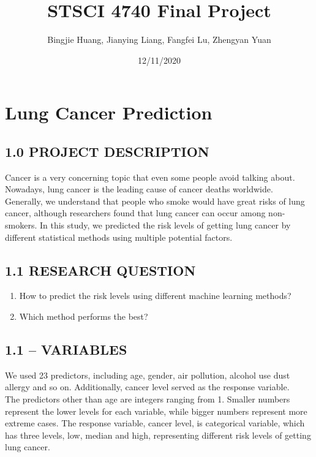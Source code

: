 \documentclass[]{article}
\title{STSCI 4740 Final Project}
\author{Bingjie Huang, Jianying Liang, Fangfei Lu, Zhengyan Yuan}
\date{12/11/2020}
\providecommand{\tightlist}{%
  \setlength{\itemsep}{0pt}\setlength{\parskip}{0pt}}
\begin{document}
\maketitle

\section{Lung Cancer Prediction}\label{lung-cancer-prediction}

\subsection{1.0 PROJECT DESCRIPTION}\label{project-description}

Cancer is a very concerning topic that even some people avoid talking
about. Nowadays, lung cancer is the leading cause of cancer deaths
worldwide. Generally, we understand that people who smoke would have
great risks of lung cancer, although researchers found that lung cancer
can occur among non-smokers. In this study, we predicted the risk levels
of getting lung cancer by different statistical methods using multiple
potential factors.

\subsection{1.1 RESEARCH QUESTION}\label{research-question}

\begin{enumerate}
\def\labelenumi{\arabic{enumi}.}
\tightlist
\item
  How to predict the risk levels using different machine learning
  methods?\\
\item
  Which method performs the best?
\end{enumerate}

\subsection{1.1 -- VARIABLES}\label{variables}

We used 23 predictors, including age, gender, air pollution, alcohol use
dust allergy and so on. Additionally, cancer level served as the
response variable.\\
The predictors other than age are integers ranging from 1. Smaller
numbers represent the lower levels for each variable, while bigger
numbers represent more extreme cases. The response variable, cancer
level, is categorical variable, which has three levels, low, median and
high, representing different risk levels of getting lung cancer.
\end{document}
